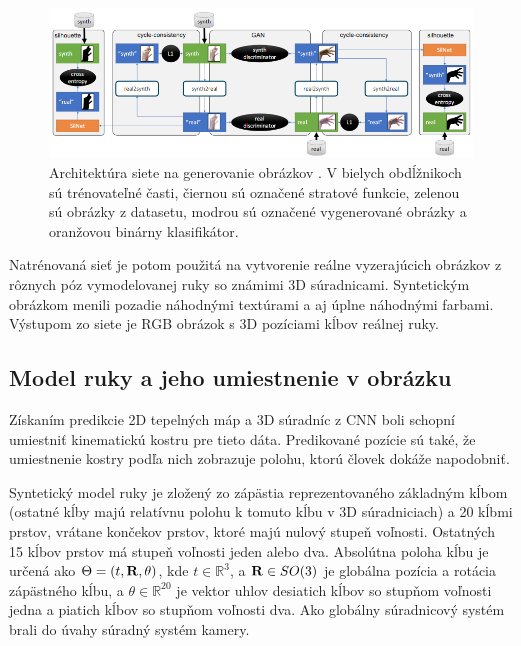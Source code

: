\begin{figure}[H]
	\begin{center}
		\includegraphics[height=\imageHeight]{images/GenerateHands.png}
		\caption{Architektúra siete na generovanie obrázkov \cite{GANeratedHands_CVPR2018}. V bielych obdĺžnikoch sú trénovateľné časti, čiernou sú označené stratové funkcie, zelenou sú obrázky z datasetu, modrou sú označené vygenerované obrázky a oranžovou binárny klasifikátor.}
		\label{img:generateHands}
	\end{center}
\end{figure}

Natrénovaná sieť je potom použitá na vytvorenie reálne vyzerajúcich obrázkov z rôznych póz vymodelovanej ruky so známimi 3D súradnicami. Syntetickým obrázkom menili pozadie náhodnými textúrami a aj úplne náhodnými farbami. Výstupom zo siete je RGB obrázok s 3D pozíciami kĺbov reálnej ruky.

\subsection{Model ruky a jeho umiestnenie v obrázku}
Získaním predikcie 2D tepelných máp a 3D súradníc z CNN boli schopní \cite{GANeratedHands_CVPR2018} umiestniť kinematickú kostru pre tieto dáta. Predikované pozície sú také, že umiestnenie kostry podľa nich zobrazuje polohu, ktorú človek dokáže napodobniť.

Syntetický model ruky je zložený zo zápästia reprezentovaného základným kĺbom (ostatné kĺby majú relatívnu polohu k tomuto kĺbu v 3D súradniciach) a 20 kĺbmi prstov, vrátane končekov prstov, ktoré majú nulový stupeň voľnosti. Ostatných 15 kĺbov prstov má stupeň voľnosti jeden alebo dva. Absolútna poloha kĺbu je určená ako $\Theta = (t, {\bf R}, \theta)$, kde $t \in \mathbb{R}^3$, a ${\bf R} \in SO(3)$ je globálna pozícia a rotácia zápästného kĺbu, a $\theta \in \mathbb{R}^{20}$ je vektor uhlov desiatich kĺbov so stupňom voľnosti jedna a piatich kĺbov so stupňom voľnosti dva. Ako globálny súradnicový systém brali do úvahy súradný systém kamery.


